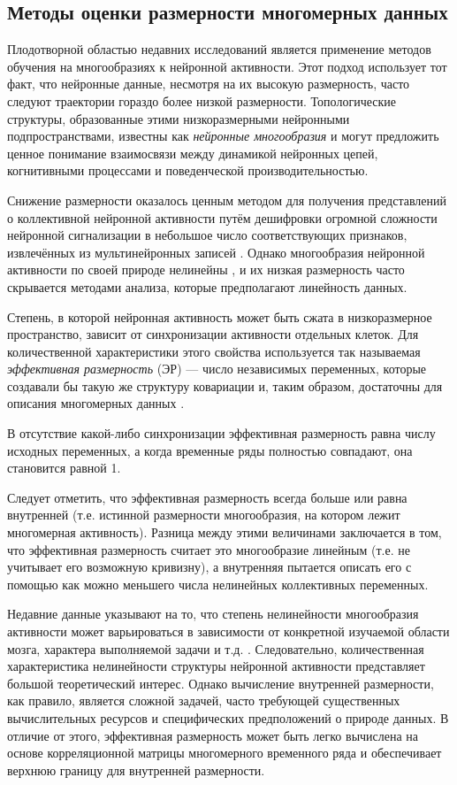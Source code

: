 \subsection{Методы оценки размерности многомерных данных}
Плодотворной областью недавних исследований является применение методов обучения на многообразиях к нейронной активности. Этот подход использует тот факт, что нейронные данные, несмотря на их высокую размерность, часто следуют траектории гораздо более низкой размерности. Топологические структуры, образованные этими низкоразмерными нейронными подпространствами, известны как \textit{нейронные многообразия} \cite{Gallego2017} и могут предложить ценное понимание взаимосвязи между динамикой нейронных цепей, когнитивными процессами и поведенческой производительностью.

Снижение размерности оказалось ценным методом для получения представлений о коллективной нейронной активности путём дешифровки огромной сложности нейронной сигнализации в небольшое число соответствующих признаков, извлечённых из мультинейронных записей \cite{Cunningham2014}. Однако многообразия нейронной активности по своей природе нелинейны \cite{De2023}, и их низкая размерность часто скрывается методами анализа, которые предполагают линейность данных.

Степень, в которой нейронная активность может быть сжата в низкоразмерное пространство, зависит от синхронизации активности отдельных клеток. Для количественной характеристики этого свойства используется так называемая \emph{эффективная размерность} (ЭР) — число независимых переменных, которые создавали бы такую же структуру ковариации и, таким образом, достаточны для описания многомерных данных \cite{edim}.

В отсутствие какой-либо синхронизации эффективная размерность равна числу исходных переменных, а когда временные ряды полностью совпадают, она становится равной 1.

Следует отметить, что эффективная размерность всегда больше или равна внутренней (т.е. истинной размерности многообразия, на котором лежит многомерная активность). Разница между этими величинами заключается в том, что эффективная размерность считает это многообразие линейным (т.е. не учитывает его возможную кривизну), а внутренняя пытается описать его с помощью как можно меньшего числа нелинейных коллективных переменных.

Недавние данные указывают на то, что степень нелинейности многообразия активности может варьироваться в зависимости от конкретной изучаемой области мозга, характера выполняемой задачи и т.д. \cite{De2023, Fortunato2023}. Следовательно, количественная характеристика нелинейности структуры нейронной активности представляет большой теоретический интерес. Однако вычисление внутренней размерности, как правило, является сложной задачей, часто требующей существенных вычислительных ресурсов и специфических предположений о природе данных. В отличие от этого, эффективная размерность может быть легко вычислена на основе корреляционной матрицы многомерного временного ряда и обеспечивает верхнюю границу для внутренней размерности.

